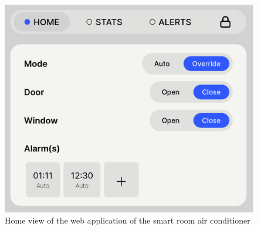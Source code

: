\begin{figure}
  \centerline{\includegraphics[scale=0.2]{resources/webapp-home-view.png}}
  \caption{Home view of the web application of the smart room air conditioner}
  \label{webapp-home-view}
\end{figure}

